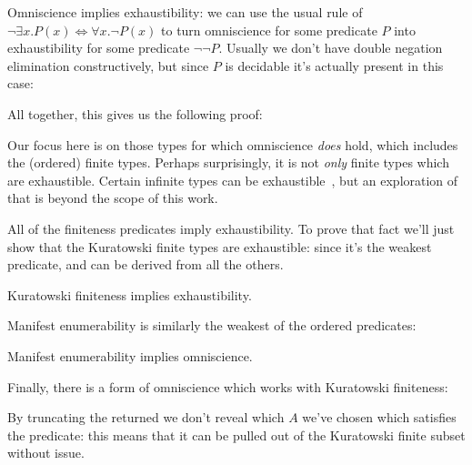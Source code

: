 Omniscience implies exhaustibility: we can use the usual rule of  \(\neg \exists x. P(x) \iff \forall x. \neg P(x) \)
to turn omniscience for some predicate \(P\) into exhaustibility for some
predicate \(\neg \neg P\).
Usually we don't have double negation elimination constructively, but since
\(P\) is decidable it's actually present in this case:
\begin{agdalisting}
\end{agdalisting}
All together, this gives us the following proof:
\begin{agdalisting}
\end{agdalisting}

Our focus here is on those types for which omniscience \emph{does} hold,
which includes the (ordered) finite types.
Perhaps surprisingly, it is not \emph{only} finite types which are exhaustible.
Certain infinite types can be
exhaustible~\cite{escardoInfiniteSetsThat2007}, but an exploration of that is
beyond the scope of this work.

All of the finiteness predicates imply exhaustibility.
To prove that fact we'll just show that the Kuratowski finite types are
exhaustible: since it's the weakest predicate, and can be derived from all the
others.
\begin{lemma}
  Kuratowski finiteness implies exhaustibility.
\end{lemma} 
Manifest enumerability is similarly the weakest of the ordered predicates:
\begin{lemma}
  Manifest enumerability implies omniscience.
\end{lemma} 

Finally, there is a form of omniscience which works with Kuratowski finiteness:
\begin{agdalisting}
\end{agdalisting}
By truncating the returned \AgdaDatatype{\ensuremath{\Sigma}} we don't reveal
which \(A\) we've chosen which satisfies the predicate: this means that it can
be pulled out of the Kuratowski finite subset without issue.
\begin{agdalisting}
\end{agdalisting}
